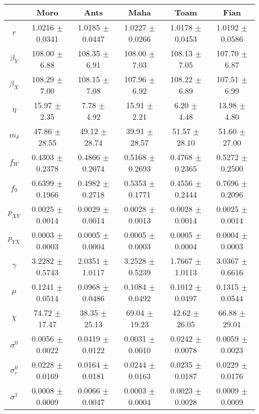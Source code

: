 \begin{sidewaystable}
\centering
\begin{tabular}{cccccc}
 & {\bf Moro} & {\bf Ants} & {\bf Maha} & {\bf Toam} & {\bf Fian} \\
\hline\hline
{\bf $r$} & 1.0216 $\pm$ 0.0341 & 1.0185 $\pm$ 0.0447 & 1.0227 $\pm$ 0.0266 & 1.0178 $\pm$ 0.0453 & 1.0192 $\pm$ 0.0586 \\
{\bf $\beta_Y$} & 108.00 $\pm$ 6.88 & 108.35 $\pm$ 6.91 & 108.00 $\pm$ 7.03 & 108.13 $\pm$ 7.05 & 107.70 $\pm$ 6.87 \\
{\bf $\beta_X$} & 108.29 $\pm$ 7.00 & 108.15 $\pm$ 7.08 & 107.96 $\pm$ 6.92 & 108.22 $\pm$ 6.89 & 107.51 $\pm$ 6.99 \\
{\bf $\eta$} & 15.97 $\pm$ 2.35 & 7.78 $\pm$ 4.92 & 15.91 $\pm$ 2.21 & 6.20 $\pm$ 4.48 & 13.98 $\pm$ 4.80 \\
{\bf $m_{\delta}$} & 47.86 $\pm$ 28.55 & 49.12 $\pm$ 28.74 & 39.91 $\pm$ 28.57 & 51.57 $\pm$ 28.10 & 51.60 $\pm$ 27.00 \\
{\bf $f_W$} & 0.4303 $\pm$ 0.2378 & 0.4866 $\pm$ 0.2074 & 0.5168 $\pm$ 0.2693 & 0.4768 $\pm$ 0.2365 & 0.5272 $\pm$ 0.2500 \\
{\bf $f_0$} & 0.6399 $\pm$ 0.1966 & 0.4982 $\pm$ 0.2718 & 0.5353 $\pm$ 0.1771 & 0.4556 $\pm$ 0.2444 & 0.7696 $\pm$ 0.2096 \\
{\bf $p_{XY}$} & 0.0025 $\pm$ 0.0014 & 0.0029 $\pm$ 0.0014 & 0.0028 $\pm$ 0.0013 & 0.0028 $\pm$ 0.0014 & 0.0025 $\pm$ 0.0014 \\
{\bf $p_{YX}$} & 0.0003 $\pm$ 0.0003 & 0.0005 $\pm$ 0.0004 & 0.0005 $\pm$ 0.0003 & 0.0005 $\pm$ 0.0004 & 0.0004 $\pm$ 0.0003 \\
{\bf $\gamma$} & 3.2282 $\pm$ 0.5743 & 2.0351 $\pm$ 1.0117 & 3.2528 $\pm$ 0.5239 & 1.7667 $\pm$ 1.0113 & 3.0367 $\pm$ 0.6616 \\
{\bf $\mu$} & 0.1241 $\pm$ 0.0514 & 0.0968 $\pm$ 0.0486 & 0.1084 $\pm$ 0.0492 & 0.1012 $\pm$ 0.0497 & 0.1315 $\pm$ 0.0544 \\
{\bf $\chi$} & 74.72 $\pm$ 17.47 & 38.35 $\pm$ 25.13 & 69.04 $\pm$ 19.23 & 42.62 $\pm$ 26.05 & 66.88 $\pm$ 29.01 \\
{\bf $\sigma^0$} & 0.0056 $\pm$ 0.0022 & 0.0419 $\pm$ 0.0122 & 0.0031 $\pm$ 0.0010 & 0.0242 $\pm$ 0.0078 & 0.0059 $\pm$ 0.0023 \\
{\bf $\sigma^0_r$} & 0.0228 $\pm$ 0.0169 & 0.0164 $\pm$ 0.0181 & 0.0244 $\pm$ 0.0163 & 0.0235 $\pm$ 0.0187 & 0.0229 $\pm$ 0.0176 \\
{\bf $\sigma^1$} & 0.0008 $\pm$ 0.0009 & 0.0066 $\pm$ 0.0047 & 0.0003 $\pm$ 0.0004 & 0.0023 $\pm$ 0.0028 & 0.0009 $\pm$ 0.0009 \\

\end{tabular}
\end{sidewaystable}
